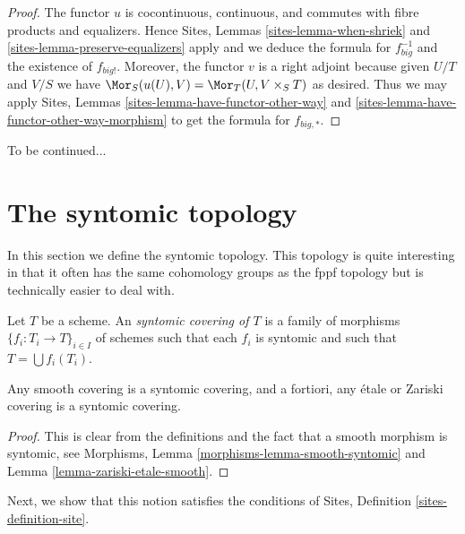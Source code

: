 \begin{proof}
The functor $u$ is cocontinuous, continuous, and commutes with fibre products
and equalizers. Hence
Sites, Lemmas \ref{sites-lemma-when-shriek} and
\ref{sites-lemma-preserve-equalizers}
apply and we deduce the formula
for $f_{big}^{-1}$ and the existence of $f_{big!}$. Moreover,
the functor $v$ is a right adjoint because given $U/T$ and $V/S$
we have $\Mor_S(u(U), V) = \Mor_T(U, V \times_S T)$
as desired. Thus we may apply
Sites, Lemmas \ref{sites-lemma-have-functor-other-way} and
\ref{sites-lemma-have-functor-other-way-morphism} to get the
formula for $f_{big, *}$.
\end{proof}

\noindent
To be continued...











\section{The syntomic topology}
\label{section-syntomic}

\noindent
In this section we define the syntomic topology.
This topology is quite interesting in that it often
has the same cohomology groups as the fppf topology
but is technically easier to deal with.

\begin{definition}
\label{definition-syntomic-covering}
Let $T$ be a scheme. An {\it syntomic covering of $T$} is a family
of morphisms $\{f_i : T_i \to T\}_{i \in I}$ of schemes
such that each $f_i$ is syntomic and such
that $T = \bigcup f_i(T_i)$.
\end{definition}

\begin{lemma}
\label{lemma-zariski-etale-smooth-syntomic}
Any smooth covering is a syntomic covering, and a fortiori,
any \'etale or Zariski covering is a syntomic covering.
\end{lemma}

\begin{proof}
This is clear from the definitions and the fact that a smooth
morphism is syntomic, see
Morphisms, Lemma \ref{morphisms-lemma-smooth-syntomic}
and Lemma \ref{lemma-zariski-etale-smooth}.
\end{proof}

\noindent
Next, we show that this notion satisfies the conditions of
Sites, Definition \ref{sites-definition-site}.

